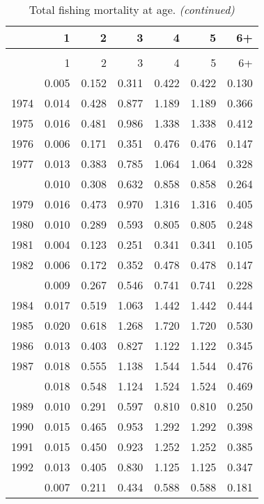 \documentclass[
]{article}
\begin{document}
\begin{longtable}[t]{lrrrrrr}
\caption{\label{tab:FAA-tot-table}Total fishing mortality at age.}\\
\toprule
  & 1 & 2 & 3 & 4 & 5 & 6+\\
\midrule
\endfirsthead
\caption[]{Total fishing mortality at age. \textit{(continued)}}\\
\toprule
  & 1 & 2 & 3 & 4 & 5 & 6+\\
\midrule
\endhead

\endfoot
\bottomrule
\endlastfoot
1973 & 0.005 & 0.152 & 0.311 & 0.422 & 0.422 & 0.130\\
1974 & 0.014 & 0.428 & 0.877 & 1.189 & 1.189 & 0.366\\
1975 & 0.016 & 0.481 & 0.986 & 1.338 & 1.338 & 0.412\\
1976 & 0.006 & 0.171 & 0.351 & 0.476 & 0.476 & 0.147\\
1977 & 0.013 & 0.383 & 0.785 & 1.064 & 1.064 & 0.328\\
\addlinespace
1978 & 0.010 & 0.308 & 0.632 & 0.858 & 0.858 & 0.264\\
1979 & 0.016 & 0.473 & 0.970 & 1.316 & 1.316 & 0.405\\
1980 & 0.010 & 0.289 & 0.593 & 0.805 & 0.805 & 0.248\\
1981 & 0.004 & 0.123 & 0.251 & 0.341 & 0.341 & 0.105\\
1982 & 0.006 & 0.172 & 0.352 & 0.478 & 0.478 & 0.147\\
\addlinespace
1983 & 0.009 & 0.267 & 0.546 & 0.741 & 0.741 & 0.228\\
1984 & 0.017 & 0.519 & 1.063 & 1.442 & 1.442 & 0.444\\
1985 & 0.020 & 0.618 & 1.268 & 1.720 & 1.720 & 0.530\\
1986 & 0.013 & 0.403 & 0.827 & 1.122 & 1.122 & 0.345\\
1987 & 0.018 & 0.555 & 1.138 & 1.544 & 1.544 & 0.476\\
\addlinespace
1988 & 0.018 & 0.548 & 1.124 & 1.524 & 1.524 & 0.469\\
1989 & 0.010 & 0.291 & 0.597 & 0.810 & 0.810 & 0.250\\
1990 & 0.015 & 0.465 & 0.953 & 1.292 & 1.292 & 0.398\\
1991 & 0.015 & 0.450 & 0.923 & 1.252 & 1.252 & 0.385\\
1992 & 0.013 & 0.405 & 0.830 & 1.125 & 1.125 & 0.347\\
\addlinespace
1993 & 0.007 & 0.211 & 0.434 & 0.588 & 0.588 & 0.181\\

\end{longtable}
\end{document}
